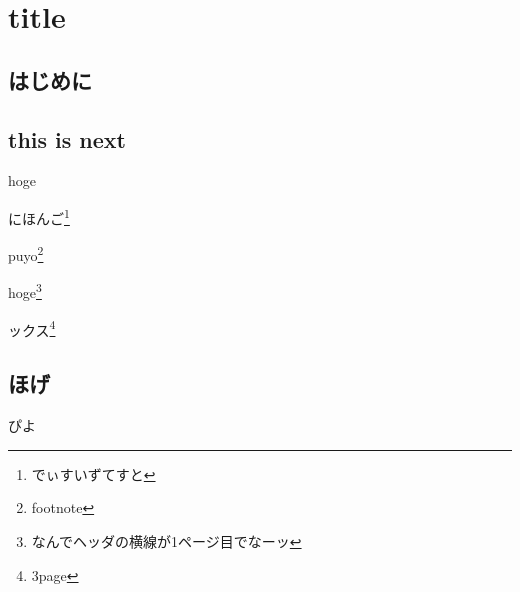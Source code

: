 \documentclass[9pt]{word-lua}
\author{著者}
\subtitle{fuck}
\begin{document}
\chapter{title}

\section{はじめに}
\section{this is next}

hoge

にほんご\footnote{でぃすいずてすと}

puyo\footnote{footnote}

hoge\footnote{なんでヘッダの横線が1ページ目でなーッ}

ックス\footnote{3page}

\newpage

\section{ほげ}

\newpage

ぴよ
\end{document}
